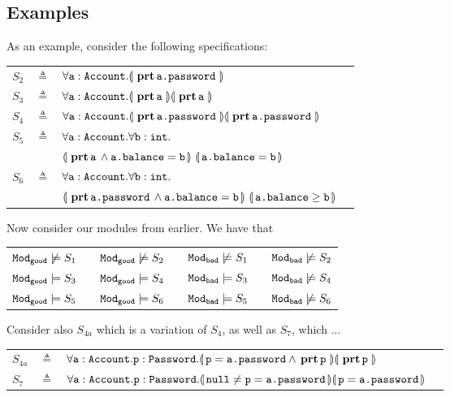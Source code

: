 {{\subsection{\SpecLang Examples}
\noindent
As an example, consider the following    specifications:

\begin{tabular}{lcll}
 $S_2$   &     $\triangleq$   & $\OneStateQ{\prg{a}:\prg{Account} } {\inside{\prg{a.password}}} $
 \\
 $S_3$   & $\triangleq$   &  $\TwoStatesQ {\prg{a}:\prg{Account}}  {\inside{\prg{a}}} {\inside{\prg{a}}} $
 \\
 $S_4$   & $\triangleq$   &  $\TwoStatesQ {\prg{a}:\prg{Account}}  {\inside{\prg{a.password}}} {\inside{\prg{a.password}}}$
 \\
$S_5$ & $\triangleq$   &
 $\forall \prg{a}:\prg{Account}.\forall \prg{b}:\prg{int}.$\\
  &  &  $\FirstState{\inside{\prg{a}} \wedge \prg{a.balance}=\prg{b}} 
\  \SecondState{ \prg{a.balance}= \prg{b} }$
\\
$S_6$ & $\triangleq$   &
  $\forall \prg{a}:\prg{Account}.\forall \prg{b}:\prg{int}.$\\
  &  &  $\FirstState{\inside{\prg{a.password}} \wedge \prg{a.balance}=\prg{b}} 
\  \SecondState{ \prg{a.balance}\geq \prg{b} }$
 \end{tabular}

\vspace{.2cm}
Now consider our modules from earlier. We have that

\begin{tabular}{lllllll}
$\ModA \not\models S_1$  & & $\ModA \not\models S_2$ &&  $\ModB \not\models S_1$ &  &$\ModB \not\models S_2$ \\
$\ModA \models S_3$ & &   $\ModA \models S_4$ & &  $\ModB  \models S_3$ & &  $\ModB  \not\models S_4$ \\
$\ModA \models S_5$ & &  $\ModA \models S_6$ & & $\ModB  \models S_5$ & & $\ModB   \not\models S_6$ \\
\end{tabular}

\vspace{.6cm}
Consider also  $S_{4a}$ which is a variation of $S_4$, as well as $S_7$, which ...

\begin{tabular}{lcll}
$S_{4a}$   &     $\triangleq$   &   ${\TwoStatesQ {\prg{a}:\prg{Account}.\prg{p}:\prg{Password}}  {\prg{p}=\prg{a.password} \wedge \inside{\prg{p}}}{\inside{\prg{p}}} }$
 \\
$S_7$ & $\triangleq$   & ${\TwoStatesQ {\prg{a}:\prg{Account}.\prg{p}:\prg{Password}}  {\prg{null}\neq \prg{p}=\prg{a.password}} {\prg{p}=\prg{a.password}} }$
 \end{tabular}
 
}}
